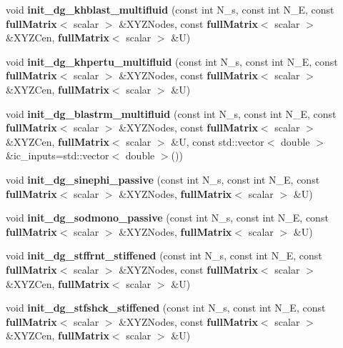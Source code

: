 \begin{DoxyCompactItemize}
\item 
void {\bfseries init\-\_\-dg\-\_\-khblast\-\_\-multifluid} (const int N\-\_\-s, const int N\-\_\-\-E, const {\bf full\-Matrix}$<$ scalar $>$ \&X\-Y\-Z\-Nodes, const {\bf full\-Matrix}$<$ scalar $>$ \&X\-Y\-Z\-Cen, {\bf full\-Matrix}$<$ scalar $>$ \&U)\label{init__cond_8h_ab090d742ad67de29d5c253bc7e1dc754}

\item 
void {\bfseries init\-\_\-dg\-\_\-khpertu\-\_\-multifluid} (const int N\-\_\-s, const int N\-\_\-\-E, const {\bf full\-Matrix}$<$ scalar $>$ \&X\-Y\-Z\-Nodes, const {\bf full\-Matrix}$<$ scalar $>$ \&X\-Y\-Z\-Cen, {\bf full\-Matrix}$<$ scalar $>$ \&U)\label{init__cond_8h_a373b5978360a1fbbafb90fa762821ce2}

\item 
void {\bfseries init\-\_\-dg\-\_\-blastrm\-\_\-multifluid} (const int N\-\_\-s, const int N\-\_\-\-E, const {\bf full\-Matrix}$<$ scalar $>$ \&X\-Y\-Z\-Nodes, const {\bf full\-Matrix}$<$ scalar $>$ \&X\-Y\-Z\-Cen, {\bf full\-Matrix}$<$ scalar $>$ \&U, const std\-::vector$<$ double $>$ \&ic\-\_\-inputs=std\-::vector$<$ double $>$())\label{init__cond_8h_a6c9bbb1280e9922ea180d8403c6317be}

\item 
void {\bfseries init\-\_\-dg\-\_\-sinephi\-\_\-passive} (const int N\-\_\-s, const int N\-\_\-\-E, const {\bf full\-Matrix}$<$ scalar $>$ \&X\-Y\-Z\-Nodes, {\bf full\-Matrix}$<$ scalar $>$ \&U)\label{init__cond_8h_ae307850e5461da8963acc925bc36d1dc}

\item 
void {\bfseries init\-\_\-dg\-\_\-sodmono\-\_\-passive} (const int N\-\_\-s, const int N\-\_\-\-E, const {\bf full\-Matrix}$<$ scalar $>$ \&X\-Y\-Z\-Nodes, {\bf full\-Matrix}$<$ scalar $>$ \&U)\label{init__cond_8h_ab740be91844be6cc7d9344d9165b2c36}

\item 
void {\bfseries init\-\_\-dg\-\_\-stffrnt\-\_\-stiffened} (const int N\-\_\-s, const int N\-\_\-\-E, const {\bf full\-Matrix}$<$ scalar $>$ \&X\-Y\-Z\-Nodes, const {\bf full\-Matrix}$<$ scalar $>$ \&X\-Y\-Z\-Cen, {\bf full\-Matrix}$<$ scalar $>$ \&U)\label{init__cond_8h_a9337e2dbc52df550b2a211823b13daf0}

\item 
void {\bfseries init\-\_\-dg\-\_\-stfshck\-\_\-stiffened} (const int N\-\_\-s, const int N\-\_\-\-E, const {\bf full\-Matrix}$<$ scalar $>$ \&X\-Y\-Z\-Nodes, const {\bf full\-Matrix}$<$ scalar $>$ \&X\-Y\-Z\-Cen, {\bf full\-Matrix}$<$ scalar $>$ \&U)\label{init__cond_8h_aace9146532de5f2d8edbf43fbb256def}


\end{DoxyCompactItemize}
